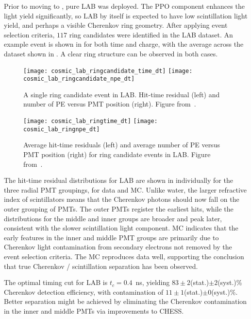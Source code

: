 \label{sec:lab}

Prior to moving to {\labppo}, pure LAB was deployed. 
The PPO component enhances the light yield significantly, so LAB by itself is expected to have low scintillation light yield, and perhaps a visible Cherenkov ring geometry.
After applying event selection criteria, $117$ ring candidates were identified in the LAB dataset. 
An example event is shown in  for both time and charge, with the average across the dataset shown in . 
A clear ring structure can be observed in both cases. 

\begin{figure}
\centering
\texttt{[image: cosmic\_lab\_ringcandidate\_time\_dt]}
\hfill
\texttt{[image: cosmic\_lab\_ringcandidate\_npe\_dt]}
\caption{A single ring candidate event in LAB. Hit-time residual (left) and number of PE versus PMT position (right). Figure from~\cite{chess_lab}.}
\label{fig:lab_ring}
\end{figure}

\begin{figure}
\centering
\texttt{[image: cosmic\_lab\_ringtime\_dt]}
\hfill
\texttt{[image: cosmic\_lab\_ringnpe\_dt]}
\caption{Average hit-time residuals (left) and average number of PE versus PMT position (right) for ring candidate events in LAB. Figure from~\cite{chess_lab}.}
\label{fig:lab2}
\end{figure}


The hit-time residual distributions for LAB are shown in  individually for the three radial PMT groupings, for data and MC. 
Unlike water, the larger refractive index of scintillators means that the Cherenkov photons should now fall on the outer grouping of PMTs.
The outer PMTs register the earliest hits, while the distributions for the middle and inner groups are broader and peak later, consistent with the slower scintillation light component. 
MC indicates that the early features in the inner and middle PMT groups are primarily due to Cherenkov light contamination from secondary electrons not removed by the event selection criteria.
The MC reproduces data well, supporting the conclusion that true Cherenkov / scintillation separation has been observed. 

The optimal timing cut for LAB is $ t_c = 0.4$~ns,  yielding $83\pm2$(stat.)$\pm2$(syst.)\% Cherenkov detection efficiency, with contamination of $11\pm1$(stat.)$\pm0$(syst.)\%. 
Better separation might be achieved by eliminating the Cherenkov contamination in the inner and middle PMTs via improvements to CHESS.

